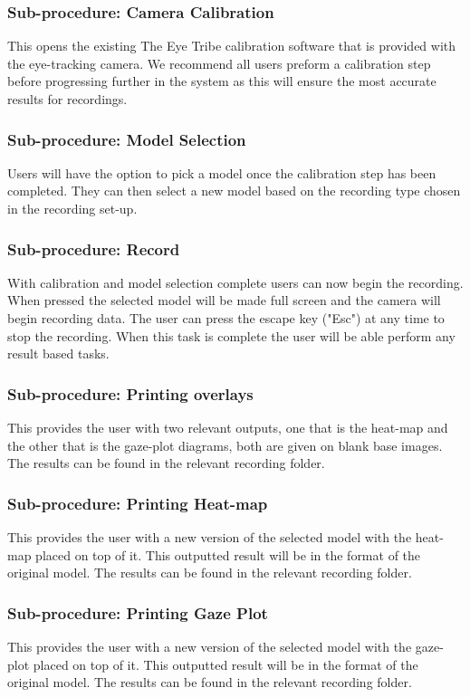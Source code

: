 \subsubsection{Sub-procedure: Camera Calibration}
This opens the existing The Eye Tribe calibration software that is provided with the eye-tracking camera. We recommend all users preform a calibration step before progressing further in the system as this will ensure the most accurate results for recordings.

\subsubsection{Sub-procedure: Model Selection}
Users will have the option to pick a model once the calibration step has been completed. They can then select a new model based on the recording type chosen in the recording set-up.

\subsubsection{Sub-procedure: Record}
With calibration and model selection complete users can now begin the recording. When pressed the selected model will be made full screen and the camera will begin recording data. The user can press the escape key ("Esc") at any time to stop the recording. When this task is complete the user will be able perform any result based tasks.


\subsubsection{Sub-procedure: Printing overlays}
This provides the user with two relevant outputs, one that is the heat-map and the other that is the gaze-plot diagrams, both are given on blank base images. The results can be found in the relevant recording folder.


\subsubsection{Sub-procedure: Printing Heat-map}
This provides the user with a new version of the selected model with the heat-map placed on top of it. This outputted result will be in the format of the original model. The results can be found in the relevant recording folder.

\subsubsection{Sub-procedure: Printing Gaze Plot}
This provides the user with a new version of the selected model with the gaze-plot placed on top of it. This outputted result will be in the format of the original model. The results can be found in the relevant recording folder.

